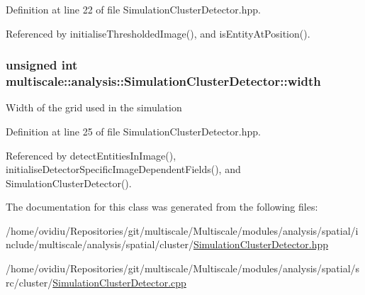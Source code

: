 \-Definition at line 22 of file \-Simulation\-Cluster\-Detector.\-hpp.



\-Referenced by initialise\-Thresholded\-Image(), and is\-Entity\-At\-Position().

\hypertarget{classmultiscale_1_1analysis_1_1SimulationClusterDetector_a4c66a82aa1749dce31c767bc4008d904}{
\subsubsection[{width}]{\setlength{\rightskip}{0pt plus 5cm}unsigned int {\bf multiscale\-::analysis\-::\-Simulation\-Cluster\-Detector\-::width}}}\label{classmultiscale_1_1analysis_1_1SimulationClusterDetector_a4c66a82aa1749dce31c767bc4008d904}
\-Width of the grid used in the simulation 

\-Definition at line 25 of file \-Simulation\-Cluster\-Detector.\-hpp.



\-Referenced by detect\-Entities\-In\-Image(), initialise\-Detector\-Specific\-Image\-Dependent\-Fields(), and \-Simulation\-Cluster\-Detector().



\-The documentation for this class was generated from the following files\-:\begin{DoxyCompactItemize}
\item 
/home/ovidiu/\-Repositories/git/multiscale/\-Multiscale/modules/analysis/spatial/include/multiscale/analysis/spatial/cluster/\hyperlink{SimulationClusterDetector_8hpp}{\-Simulation\-Cluster\-Detector.\-hpp}\item 
/home/ovidiu/\-Repositories/git/multiscale/\-Multiscale/modules/analysis/spatial/src/cluster/\hyperlink{SimulationClusterDetector_8cpp}{\-Simulation\-Cluster\-Detector.\-cpp}\end{DoxyCompactItemize}
